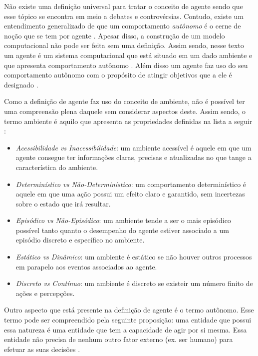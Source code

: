 Não existe uma definição universal para tratar o conceito de agente sendo que esse tópico se encontra em meio a debates e controvérsias. Contudo, existe um entendimento generalizado de que um comportamento \textit{autônomo} é o cerne de noção que se tem por agente \cite{whatisagent}. Apesar disso, a construção de um modelo computacional não pode ser feita sem uma definição. Assim sendo, nesse texto um agente é um sistema computacional que está situado em um dado ambiente e que apresenta comportamento autônomo \cite{whatisagent}. Além disso um agente faz uso do seu comportamento autônomo com o propósito de atingir objetivos que a ele é designado \cite{whatisagent}.

Como a definição de agente faz uso do conceito de ambiente, não é possível ter uma compreensão plena daquele sem considerar aspectos deste. Assim sendo, o termo ambiente  é aquilo que apresenta as propriedades definidas na lista a seguir \cite{artificialinteligencemodermapproach,whatisagent}: 
\begin{itemize}
    \item \textit{Acessibilidade vs Inacessibilidade}: um ambiente acessível é aquele em que um agente consegue ter informações claras, precisas e atualizadas no que tange a característica do ambiente.
    \item \textit{Determinístico vs Não-Determinístico}: um comportamento determinístico é aquele em que uma ação possui um efeito claro e garantido, sem incertezas sobre o estado que irá resultar.
    \item \textit{Episódico vs Não-Episódico}: um ambiente tende a ser o mais episódico possível tanto quanto o desempenho do agente estiver associado a um episódio discreto e específico no ambiente.
    \item \textit{Estático vs Dinâmico}: um ambiente é estático se não houver outros processos em parapelo aos eventos associados ao agente.
    \item \textit{Discreto vs Contínuo}: um ambiente é discreto se existeir um número finito de ações e percepções. 
\end{itemize}

Outro aspecto que está presente na definição de agente é o termo autônomo. Esse termo pode ser compreendido pela seguinte proposição: uma entidade que possui essa natureza é uma entidade que tem a capacidade de agir por si mesma. Essa entidade não precisa de nenhum outro fator externo (ex. ser humano) para efetuar as suas decisões \cite{whatisagent}.


